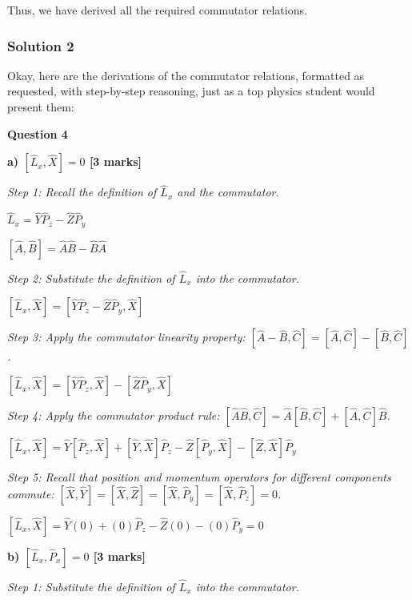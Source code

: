 \documentclass{article}
\begin{document}
Thus, we have derived all the required commutator relations.


\subsubsection{Solution 2}
Okay, here are the derivations of the commutator relations, formatted as requested, with step-by-step reasoning, just as a top physics student would present them:

\textbf{Question 4}

\textbf{a) $\left[\hat{L}_x, \hat{X}\right] = 0$ [3 marks]}

\textit{Step 1: Recall the definition of $\hat{L}_x$ and the commutator.}

$\hat{L}_x = \hat{Y}\hat{P}_z - \hat{Z}\hat{P}_y$

$\left[\hat{A}, \hat{B}\right] = \hat{A}\hat{B} - \hat{B}\hat{A}$

\textit{Step 2: Substitute the definition of $\hat{L}_x$ into the commutator.}

$\left[\hat{L}_x, \hat{X}\right] = \left[\hat{Y}\hat{P}_z - \hat{Z}\hat{P}_y, \hat{X}\right]$

\textit{Step 3: Apply the commutator linearity property: $\left[\hat{A} - \hat{B}, \hat{C}\right] = \left[\hat{A}, \hat{C}\right] - \left[\hat{B}, \hat{C}\right]$.}

$\left[\hat{L}_x, \hat{X}\right] = \left[\hat{Y}\hat{P}_z, \hat{X}\right] - \left[\hat{Z}\hat{P}_y, \hat{X}\right]$

\textit{Step 4: Apply the commutator product rule: $\left[\hat{A}\hat{B}, \hat{C}\right] = \hat{A}\left[\hat{B}, \hat{C}\right] + \left[\hat{A}, \hat{C}\right]\hat{B}$.}

$\left[\hat{L}_x, \hat{X}\right] = \hat{Y}\left[\hat{P}_z, \hat{X}\right] + \left[\hat{Y}, \hat{X}\right]\hat{P}_z - \hat{Z}\left[\hat{P}_y, \hat{X}\right] - \left[\hat{Z}, \hat{X}\right]\hat{P}_y$

\textit{Step 5: Recall that position and momentum operators for different components commute: $\left[\hat{X}, \hat{Y}\right] = \left[\hat{X}, \hat{Z}\right] = \left[\hat{X}, \hat{P}_y\right] = \left[\hat{X}, \hat{P}_z\right] = 0$.}

$\left[\hat{L}_x, \hat{X}\right] = \hat{Y}(0) + (0)\hat{P}_z - \hat{Z}(0) - (0)\hat{P}_y = 0$

\textbf{b) $\left[\hat{L}_x, \hat{P}_x\right] = 0$ [3 marks]}

\textit{Step 1: Substitute the definition of $\hat{L}_x$ into the commutator.}
\end{document}

